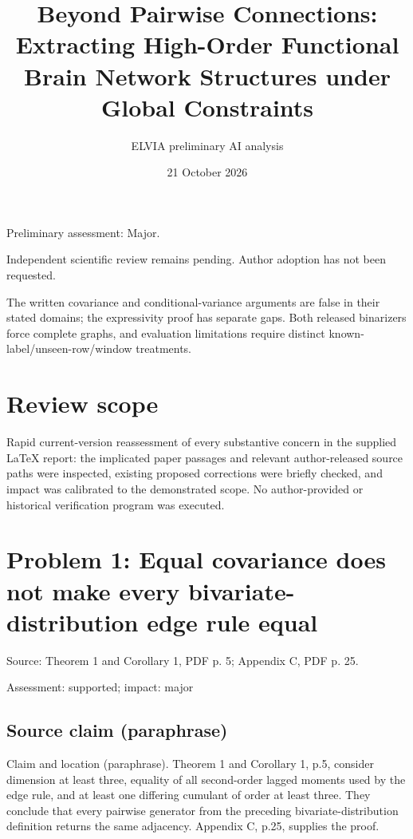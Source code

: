 \documentclass[11pt]{article}
\begin{document}
\title{Beyond Pairwise Connections: Extracting High-Order Functional Brain Network Structures under Global Constraints}

\author{ELVIA preliminary AI analysis}\date{21 October 2026}\maketitle

Preliminary assessment: Major.\par

Independent scientific review remains pending. Author adoption has not been requested.

The written covariance and conditional-variance arguments are false in their stated domains; the expressivity proof has separate gaps. Both released binarizers force complete graphs, and evaluation limitations require distinct known-label/unseen-row/window treatments.

\section*{Review scope}

Rapid current-version reassessment of every substantive concern in the supplied LaTeX report: the implicated paper passages and relevant author-released source paths were inspected, existing proposed corrections were briefly checked, and impact was calibrated to the demonstrated scope. No author-provided or historical verification program was executed.

\section*{Problem 1: Equal covariance does not make every bivariate-distribution edge rule equal}

Source: Theorem 1 and Corollary 1, PDF p. 5; Appendix C, PDF p. 25.

Assessment: supported; impact: major

\subsection*{Source claim (paraphrase)}

Claim and location (paraphrase). Theorem 1 and Corollary 1, p.5, consider dimension at least three, equality of all second-order lagged moments used by the edge rule, and at least one differing cumulant of order at least three. They conclude that every pairwise generator from the preceding bivariate-distribution definition returns the same adjacency. Appendix C, p.25, supplies the proof.
\end{document}

